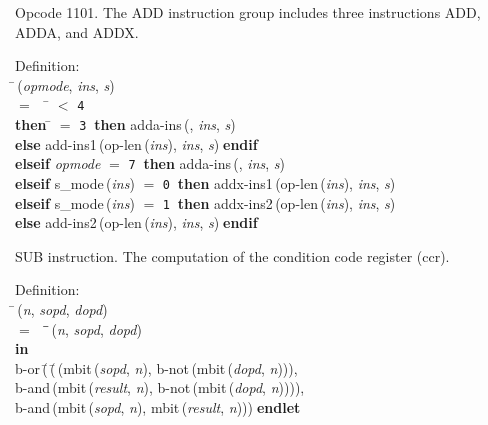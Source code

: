  Opcode 1101.
 The ADD instruction group includes three instructions ADD, ADDA, and ADDX.
\begin{tabbing}{\sc Definition}: \\  
\=\,({\it{opmode\/}}, {\it{ins\/}}, {\it{s\/}}) \\ 
$=$$\;\;\;\;$\= $<$ {\tt{4}} \\ 
{\bf then }\= $=$ {\tt{3}}$\;\;${\bf then }{\rm{adda-ins}}\,({}, {\it{ins\/}}, {\it{s\/}}) \\ 
{\bf else }{\rm{add-ins1}}\,({\rm{op-len}}\,({\it{ins\/}}), {\it{ins\/}}, {\it{s\/}})$\;${\bf  endif}\- \\ 
{\bf elseif }{\it{opmode\/}} $=$ {\tt{7}}$\;\;${\bf then }{\rm{adda-ins}}\,({}, {\it{ins\/}}, {\it{s\/}}) \\ 
{\bf elseif }{\rm{s\_mode}}\,({\it{ins\/}}) $=$ {\tt{0}}$\;\;${\bf then }{\rm{addx-ins1}}\,({\rm{op-len}}\,({\it{ins\/}}), {\it{ins\/}}, {\it{s\/}}) \\ 
{\bf elseif }{\rm{s\_mode}}\,({\it{ins\/}}) $=$ {\tt{1}}$\;\;${\bf then }{\rm{addx-ins2}}\,({\rm{op-len}}\,({\it{ins\/}}), {\it{ins\/}}, {\it{s\/}}) \\ 
{\bf else }{\rm{add-ins2}}\,({\rm{op-len}}\,({\it{ins\/}}), {\it{ins\/}}, {\it{s\/}})$\;${\bf  endif}\-\-
\end{tabbing}

 SUB instruction.
 The computation of the condition code register (ccr).
\begin{tabbing}{\sc Definition}: \\  
\=\,({\it{n\/}}, {\it{sopd\/}}, {\it{dopd\/}}) \\ 
$=$$\;\;\;\;$\=\=\,({\it{n\/}}, {\it{sopd\/}}, {\it{dopd\/}})\- \\ 
{\bf in} \\ 
{\rm{b-or}}\,(\=\,(\=\,({\rm{mbit}}\,({\it{sopd\/}}, {\it{n\/}}), {\rm{b-not}}\,({\rm{mbit}}\,({\it{dopd\/}}, {\it{n\/}}))), \\ 
{\rm{b-and}}\,({\rm{mbit}}\,({\it{result\/}}, {\it{n\/}}), {\rm{b-not}}\,({\rm{mbit}}\,({\it{dopd\/}}, {\it{n\/}}))))\-, \\ 
{\rm{b-and}}\,({\rm{mbit}}\,({\it{sopd\/}}, {\it{n\/}}), {\rm{mbit}}\,({\it{result\/}}, {\it{n\/}})))\-$\;${\bf  endlet}\-\-
\end{tabbing}

